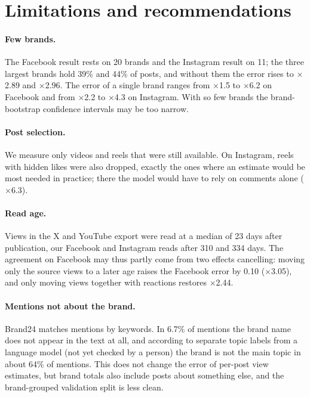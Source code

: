 \documentclass[10pt,a4paper]{article}
\newcommand{\x}[1]{$\times$#1}
\begin{document}
\section{Limitations and recommendations}\label{sec:lim}


\paragraph{Few brands.} The Facebook result rests on 20 brands and the Instagram result on 11; the three largest brands
hold 39\% and 44\% of posts, and without them the error rises to \x{2.89} and \x{2.96}. The error of a single brand
ranges from \x{1.5} to \x{6.2} on Facebook and from \x{2.2} to \x{4.3} on Instagram. With so few brands the
brand-bootstrap confidence intervals may be too narrow.

\paragraph{Post selection.} We measure only videos and reels that were still available. On Instagram, reels with hidden
likes were also dropped, exactly the ones where an estimate would be most needed in practice; there the model would have
to rely on comments alone (\x{6.3}).

\paragraph{Read age.} Views in the X and YouTube export were read at a median of 23 days after publication, our
Facebook and Instagram reads after 310 and 334 days. The agreement on Facebook may thus partly come from two effects
cancelling: moving only the source views to a later age raises the Facebook error by 0.10 (\x{3.05}), and only moving
views together with reactions restores \x{2.44}.

\paragraph{Mentions not about the brand.} Brand24 matches mentions by keywords. In 6.7\% of mentions the brand name does
not appear in the text at all, and according to separate topic labels from a language model (not yet checked by a
person) the brand is not the main topic in about 64\% of mentions. This does not change the error of per-post view
estimates, but brand totals also include posts about something else, and the brand-grouped validation split is less
clean.
\end{document}
